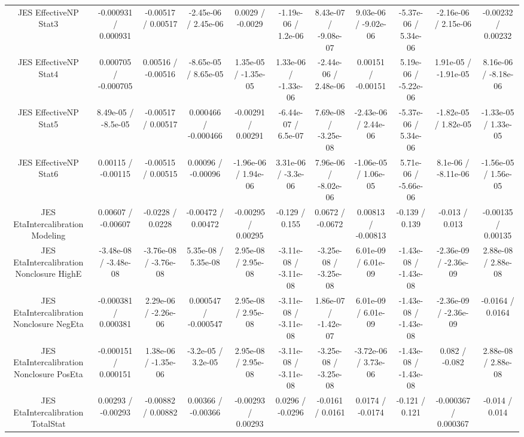 \begin{table}[htbp]
\begin{center}
\begin{tabular}{|c|c|c|c|c|c|c|c|c|c|c|}
  JES EffectiveNP Stat3 & -0.000931 / 0.000931 & -0.00517 / 0.00517 & -2.45e-06 / 2.45e-06 & 0.0029 / -0.0029 & -1.19e-06 / 1.2e-06 & 8.43e-07 / -9.08e-07 & 9.03e-06 / -9.02e-06 & -5.37e-06 / 5.34e-06 & -2.16e-06 / 2.15e-06 & -0.00232 / 0.00232 \\ 
  JES EffectiveNP Stat4 & 0.000705 / -0.000705 & 0.00516 / -0.00516 & -8.65e-05 / 8.65e-05 & 1.35e-05 / -1.35e-05 & 1.33e-06 / -1.33e-06 & -2.44e-06 / 2.48e-06 & 0.00151 / -0.00151 & 5.19e-06 / -5.22e-06 & 1.91e-05 / -1.91e-05 & 8.16e-06 / -8.18e-06 \\ 
  JES EffectiveNP Stat5 & 8.49e-05 / -8.5e-05 & -0.00517 / 0.00517 & 0.000466 / -0.000466 & -0.00291 / 0.00291 & -6.44e-07 / 6.5e-07 & 7.69e-08 / -3.25e-08 & -2.43e-06 / 2.44e-06 & -5.37e-06 / 5.34e-06 & -1.82e-05 / 1.82e-05 & -1.33e-05 / 1.33e-05 \\ 
  JES EffectiveNP Stat6 & 0.00115 / -0.00115 & -0.00515 / 0.00515 & 0.00096 / -0.00096 & -1.96e-06 / 1.94e-06 & 3.31e-06 / -3.3e-06 & 7.96e-06 / -8.02e-06 & -1.06e-05 / 1.06e-05 & 5.71e-06 / -5.66e-06 & 8.1e-06 / -8.11e-06 & -1.56e-05 / 1.56e-05 \\ 
  JES EtaIntercalibration Modeling & 0.00607 / -0.00607 & -0.0228 / 0.0228 & -0.00472 / 0.00472 & -0.00295 / 0.00295 & -0.129 / 0.155 & 0.0672 / -0.0672 & 0.00813 / -0.00813 & -0.139 / 0.139 & -0.013 / 0.013 & -0.00135 / 0.00135 \\ 
  JES EtaIntercalibration Nonclosure HighE & -3.48e-08 / -3.48e-08 & -3.76e-08 / -3.76e-08 & 5.35e-08 / 5.35e-08 & 2.95e-08 / 2.95e-08 & -3.11e-08 / -3.11e-08 & -3.25e-08 / -3.25e-08 & 6.01e-09 / 6.01e-09 & -1.43e-08 / -1.43e-08 & -2.36e-09 / -2.36e-09 & 2.88e-08 / 2.88e-08 \\ 
  JES EtaIntercalibration Nonclosure NegEta & -0.000381 / 0.000381 & 2.29e-06 / -2.26e-06 & 0.000547 / -0.000547 & 2.95e-08 / 2.95e-08 & -3.11e-08 / -3.11e-08 & 1.86e-07 / -1.42e-07 & 6.01e-09 / 6.01e-09 & -1.43e-08 / -1.43e-08 & -2.36e-09 / -2.36e-09 & -0.0164 / 0.0164 \\ 
  JES EtaIntercalibration Nonclosure PosEta & -0.000151 / 0.000151 & 1.38e-06 / -1.35e-06 & -3.2e-05 / 3.2e-05 & 2.95e-08 / 2.95e-08 & -3.11e-08 / -3.11e-08 & -3.25e-08 / -3.25e-08 & -3.72e-06 / 3.73e-06 & -1.43e-08 / -1.43e-08 & 0.082 / -0.082 & 2.88e-08 / 2.88e-08 \\ 
  JES EtaIntercalibration TotalStat & 0.00293 / -0.00293 & -0.00882 / 0.00882 & 0.00366 / -0.00366 & -0.00293 / 0.00293 & 0.0296 / -0.0296 & -0.0161 / 0.0161 & 0.0174 / -0.0174 & -0.121 / 0.121 & -0.000367 / 0.000367 & -0.014 / 0.014 \\ 

\end{tabular}
\end{center}
\end{table}
